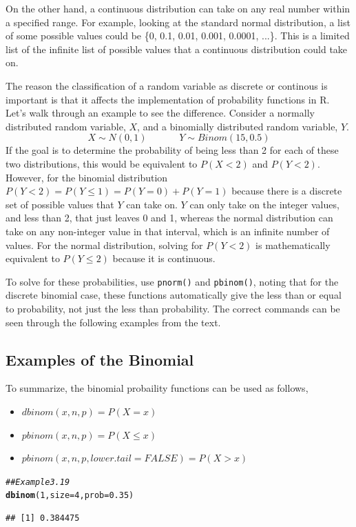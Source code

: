 \documentclass{report}\usepackage[]{graphicx}\usepackage[]{color}
\makeatletter
\newcommand{\hlnum}[1]{\textcolor[rgb]{0.686,0.059,0.569}{#1}}%
\newcommand{\hlcom}[1]{\textcolor[rgb]{0.678,0.584,0.686}{\textit{#1}}}%
\newcommand{\hlstd}[1]{\textcolor[rgb]{0.345,0.345,0.345}{#1}}%
\newcommand{\hlkwc}[1]{\textcolor[rgb]{0.333,0.667,0.333}{#1}}%
\newcommand{\hlkwd}[1]{\textcolor[rgb]{0.737,0.353,0.396}{\textbf{#1}}}%
\newenvironment{kframe}{%
 \def\at@end@of@kframe{}%
 \ifinner\ifhmode%
  \def\at@end@of@kframe{\end{minipage}}%
  \begin{minipage}{\columnwidth}%
 \fi\fi%
 \def\FrameCommand##1{\hskip\@totalleftmargin \hskip-\fboxsep
 \colorbox{shadecolor}{##1}\hskip-\fboxsep
     \hskip-\linewidth \hskip-\@totalleftmargin \hskip\columnwidth}%
 \MakeFramed {\advance\hsize-\width
   \@totalleftmargin\z@ \linewidth\hsize
   \@setminipage}}%
 {\par\unskip\endMakeFramed%
 \at@end@of@kframe}
\newenvironment{knitrout}{}{} %
\makeatother
\begin{document}
On the other hand, a continuous distribution can take on any real number within a specified range.  For example, looking at the standard normal distribution, a list of some possible values could be \{0, 0.1, 0.01, 0.001, 0.0001, ...\}.  This is a limited list of the infinite list of possible values that a continuous distribution could take on.  

The reason the classification of a random variable as discrete or continous is important is that it affects the implementation of probability functions in \textsf{R}.  Let's walk through an example to see the difference.  Consider a normally distributed random variable, $X$, and a binomially distributed random variable, $Y$. 
\[ X \sim N(0,1) \; \; \; \; \; \; \; \; \; \; \; \;  Y \sim Binom(15,0.5) \]
If the goal is to determine the probability of being less than 2 for each of these two distributions, this would be equivalent to $P(X < 2)$ and $P(Y < 2)$.  However, for the binomial distribution $P(Y<2) = P(Y \leq 1) = P(Y=0) + P(Y=1)$ because there is a discrete set of possible values that $Y$ can take on.  $Y$ can only take on the integer values, and less than 2, that just leaves 0 and 1, whereas the normal distribution can take on any non-integer value in that interval, which is an infinite number of values.  For the normal distribution, solving for $P(Y<2)$ is mathematically equivalent to $P(Y \leq 2)$ because it is continuous.  

To solve for these probabilities, use \texttt{pnorm()} and \texttt{pbinom()}, noting that for the discrete binomial case, these functions automatically give the less than or equal to probability, not just the less than probability.  The correct commands can be seen through the following examples from the text. 
\subsection{Examples of the Binomial}
\vspace{0.5cm}
To summarize, the binomial probaility functions can be used as follows, 
\begin{itemize} 
\item $dbinom(x,n,p) = P(X = x)$ 
\item $pbinom(x,n,p) = P(X \leq x)$ 
\item $pbinom(x,n,p, lower.tail = FALSE) = P(X > x)$ 
\end{itemize} 

\begin{knitrout}
\color{fgcolor}\begin{kframe}
\begin{alltt}
\hlcom{## Example 3.19 }
\hlkwd{dbinom}\hlstd{(}\hlnum{1}\hlstd{,} \hlkwc{size} \hlstd{=} \hlnum{4}\hlstd{,} \hlkwc{prob} \hlstd{=} \hlnum{0.35}\hlstd{)}
\end{alltt}
\begin{verbatim}
## [1] 0.384475
\end{verbatim}
\end{kframe}
\end{knitrout}
\end{document}
